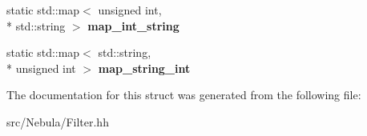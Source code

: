 \begin{DoxyCompactItemize}
\item 
\hypertarget{structNeb_1_1Filter_1_1Filter_afd357998a65a640858d9b9d1f8e729d5}{static std\-::map$<$ unsigned int, \\*
std\-::string $>$ {\bfseries map\-\_\-int\-\_\-string}}\label{structNeb_1_1Filter_1_1Filter_afd357998a65a640858d9b9d1f8e729d5}

\item 
\hypertarget{structNeb_1_1Filter_1_1Filter_ac43b100f5e97bcf435218cec70f0ebba}{static std\-::map$<$ std\-::string, \\*
unsigned int $>$ {\bfseries map\-\_\-string\-\_\-int}}\label{structNeb_1_1Filter_1_1Filter_ac43b100f5e97bcf435218cec70f0ebba}

\end{DoxyCompactItemize}


The documentation for this struct was generated from the following file\-:\begin{DoxyCompactItemize}
\item 
src/\-Nebula/Filter.\-hh\end{DoxyCompactItemize}
